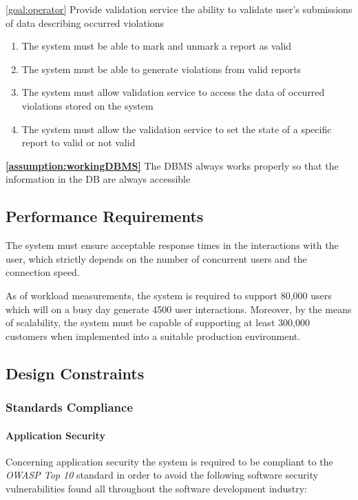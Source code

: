 \begin{description}
		\item \ref{goal:operator} Provide validation service the ability to validate user's submissions of data describing occurred violations
			   \begin{enumerate}[resume*]
				   \item The system must be able to mark and unmark a report as valid
				   \item The system must be able to generate violations from valid reports
				   \item The system must allow validation service to access the data of occurred violations stored on the system
				   \item The system must allow the validation service to set the state of a speciﬁc report to valid or not valid
			   \end{enumerate}

			   \textbf{\ref{assumption:workingDBMS}} The DBMS always works properly so that the information in the DB are always accessible



   	\end{description}
   	
\clearpage 

\subsection{Performance Requirements}

The system must ensure acceptable response times in the interactions with the user, which strictly depends on the number of concurrent users and the connection speed.
	
As of workload measurements, the system is required to support 80,000 users which will on a busy day generate 4500 user interactions. Moreover, by the means of scalability, the system must be capable of supporting at least 300,000 customers when implemented into a suitable production environment.

\subsection{Design Constraints}

\subsubsection{Standards Compliance}

\paragraph{Application Security} Concerning application security the system is required to be compliant to the \emph{OWASP Top 10} standard in order to avoid the following software security vulnerabilities found all throughout the software development industry:

